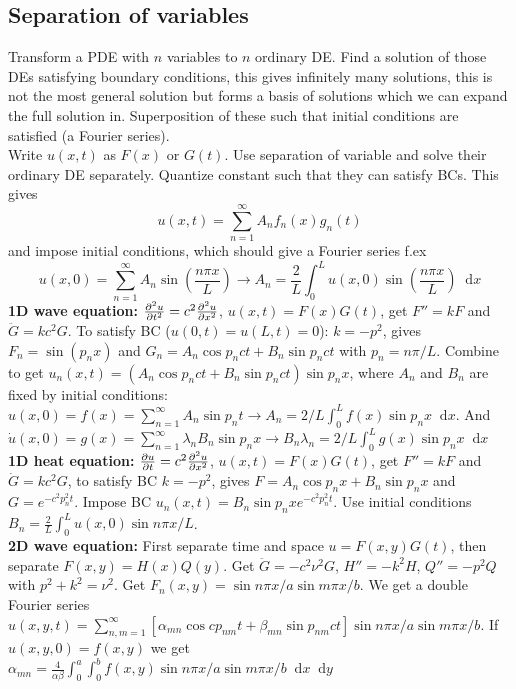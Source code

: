 \documentclass[a4paper, 10pt]{article}
\newcommand*\diff{\mathop{}\!\mathrm{d}}
\begin{document}
\begin{multicols*}{3}
\subsection*{Separation of variables}
Transform a PDE with $n$ variables to $n$ ordinary DE. Find a solution of those DEs satisfying boundary conditions, this gives infinitely many solutions, this is not the most general solution but forms a basis of solutions which we can expand the full solution in. Superposition of these such that initial conditions are satisfied (a Fourier series).\\
Write $u(x,t)$ as $F(x)$ or $G(t)$. Use separation of variable and solve their ordinary DE separately. Quantize constant such that they can satisfy BCs. This gives
$$ u(x,t) = \sum_{n=1}^{\infty} A_n f_n(x)g_n(t)$$
and impose initial conditions, which should give a Fourier series f.ex
$$ u(x,0) = \sum_{n=1}^\infty A_n \sin{\left( \frac{n\pi x}{L} \right)} \rightarrow A_n = \frac{2}{L}\int_0^L u(x,0) \sin{\left( \frac{n\pi x}{L} \right)} \diff x$$
\textbf{1D wave equation:} $\pdv[2]{u}{t} = c^2\pdv[2]{u}{x}$, $u(x,t) = F(x)G(t)$, get $F'' = kF$ and $\ddot{G} = kc^2G$. To satisfy BC ($u(0,t) = u(L,t)=0$): $k=-p^2$, gives $F_n = \sin{\left(p_nx\right)}$ and $G_n = A_n \cos{p_nc t} + B_n\sin{p_nc t}$ with $p_n=n\pi/L$.
Combine to get $u_n(x,t) = \left(A_n \cos{p_nc t} + B_n\sin{p_nc t}\right)\sin{p_nx}$, where $A_n$ and $B_n$ are fixed by initial conditions: $u(x,0) = f(x) = \sum_{n=1}^{\infty}A_n \sin{p_n t} \rightarrow A_n = 2/L \int_0^Lf(x)\sin{p_nx}\diff x$. And $\dot{u}(x,0)=g(x)=\sum_{n=1}^{\infty}\lambda_nB_n\sin{p_nx} \rightarrow B_n\lambda_n = 2/L \int_0^L g(x)\sin{p_nx}\diff x$ \\
\textbf{1D heat equation:} $\pdv{u}{t} = c^2\pdv[2]{u}{x}$, $u(x,t) = F(x)G(t)$, get $F'' = kF$ and $\dot{G} = kc^2G$, to satisfy BC $k=-p^2$, gives $F=A_n\cos{p_nx}+B_n\sin{p_nx}$ and $G = e^{-c^2p_n^2t}$. Impose BC $u_n(x,t) = B_n\sin{p_nx}e^{-c^2p_n^2t}$. Use initial conditions $B_n=\frac{2}{L}\int_0^Lu(x,0)\sin{n\pi x/L}$.\\
\textbf{2D wave equation:} First separate time and space $u = F(x,y)G(t)$, then separate $F(x,y) = H(x)Q(y)$. Get $\ddot{G}=-c^2\nu^2G$, $H'' = -k^2H$, $Q'' = -p^2Q$ with $p^2+k^2 = \nu^2$. Get $F_{n}(x,y) = \sin{n\pi x/a}\sin{m\pi x/b}$. We get a double Fourier series
$u(x,y,t) = \sum_{n,m=1}^{\infty}[\alpha_{mn}\cos{cp_{nm}t} + \beta_{mn}\sin{p_{nm}ct}]\sin{n\pi x/a}\sin{m\pi x/b}$. If $u(x,y,0) = f(x,y)$ we get
$\alpha_{mn} = \frac{4}{\alpha\beta}\int_0^a\int_0^b f(x,y)\sin{n\pi x/a}\sin{m\pi x/b} \diff x \diff y$


\end{multicols*}
\end{document}

